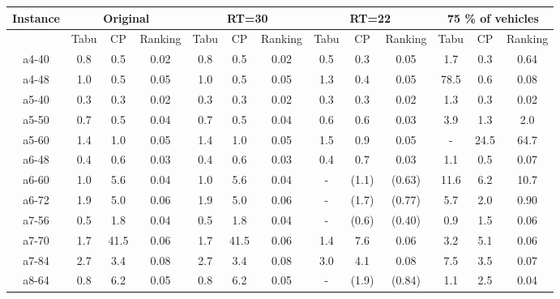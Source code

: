 \documentclass[dissertation,draft*]{aaltoseries}
\begin{document}
\begin{table}
{\tiny
\begin{center}
\begin{tabular}{|c|ccc|ccc|ccc|ccc|}
\hline
Instance & \multicolumn{3}{|c|}{Original} & \multicolumn{3}{|c|}{RT=30} & \multicolumn{3}{|c|}{RT=22} & \multicolumn{3}{|c|}{75 \% of vehicles} \\
\hline
& Tabu & CP & Ranking & Tabu & CP & Ranking & Tabu & CP & Ranking & Tabu & CP & Ranking\\
\hline
a4-40 & 0.8 & 0.5 & 0.02 & 0.8 & 0.5 & 0.02 &0.5 & 0.3 &0.05 & 1.7 & 0.3 & 0.64\\ %
\hline
a4-48 & 1.0 & 0.5 & 0.05 & 1.0 & 0.5 & 0.05 &1.3 & 0.4 &0.05& 78.5 & 0.6 & 0.08 \\ %
\hline
a5-40 & 0.3 & 0.3 & 0.02 & 0.3 & 0.3 & 0.02 &0.3 & 0.3 &0.02& 1.3 & 0.3 & 0.02\\ %
\hline
a5-50 & 0.7 & 0.5 & 0.04 & 0.7 & 0.5 & 0.04 &0.6 & 0.6 &0.03& 3.9 & 1.3 &2.0\\ %
\hline
a5-60 & 1.4 & 1.0 & 0.05    & 1.4 & 1.0 & 0.05 &1.5 & 0.9 &0.05& - & 24.5 & 64.7 \\ %
\hline
a6-48 & 0.4 & 0.6 & 0.03    & 0.4 & 0.6 & 0.03 &0.4 & 0.7 &0.03& 1.1 & 0.5 &0.07\\ %
\hline
a6-60 & 1.0 & 5.6 & 0.04    & 1.0 & 5.6 & 0.04 & - & (1.1) &(0.63)& 11.6 & 6.2 & 10.7 \\ %
\hline
a6-72 & 1.9 & 5.0 &  0.06   & 1.9 & 5.0 & 0.06 & - & (1.7) &(0.77) & 5.7 & 2.0 &0.90\\ %
\hline
a7-56 & 0.5 & 1.8 &  0.04   & 0.5 & 1.8 & 0.04 & - & (0.6) &(0.40)& 0.9 & 1.5 &0.06\\ %
\hline
a7-70 & 1.7 & 41.5 & 0.06   & 1.7 & 41.5 & 0.06 & 1.4 & 7.6 &0.06& 3.2 & 5.1 &0.06\\ %
\hline
a7-84 & 2.7 & 3.4 & 0.08   & 2.7 & 3.4 & 0.08 & 3.0 & 4.1 &0.08& 7.5 & 3.5 &0.07\\ %
\hline
a8-64 & 0.8 & 6.2 & 0.05    & 0.8 & 6.2 & 0.05 & - &  (1.9) & (0.84) & 1.1 & 2.5 &0.04\\ %

\end{tabular}
\end{center}}
\end{table}
\end{document}
